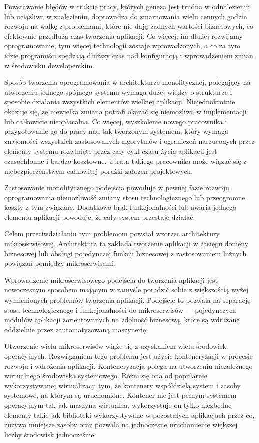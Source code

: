 \documentclass[12pt,twoside]{article}
\begin{document}
Powstawanie błędów w trakcie pracy, których geneza jest trudna w odnalezieniu lub uciążliwa w znalezieniu, doprowadza do zmarnowania wielu cennych godzin rozwoju na walkę z problemami, które nie dają żadnych wartości biznesowych, co efektownie przedłuża czas tworzenia aplikacji. Co więcej, im dłużej rozwijamy oprogramowanie, tym więcej technologii zostaje wprowadzonych, a co za tym idzie programiści spędzają dłuższy czas nad konfiguracją i wprowadzeniem zmian w środowisku deweloperskim.

Sposób tworzenia oprogramowania w architekturze monolitycznej, polegający na utworzeniu jednego spójnego systemu wymaga dużej wiedzy o strukturze i sposobie działania wszystkich elementów wielkiej aplikacji. Niejednokrotnie okazuje się, że niewielka zmiana potrafi okazać się niemożliwa w implementacji lub całkowicie nieopłacalna. Co więcej, wyszkolenie nowego pracownika i przygotowanie go do pracy nad tak tworzonym systemem, który wymaga znajomości wszystkich zastosowanych algorytmów i ograniczeń narzuconych przez elementy systemu rozwinięte przez cały cykl czasu życia aplikacji jest czasochłonne i bardzo kosztowne. Utrata takiego pracownika może wiązać się z niebezpieczeństwem całkowitej porażki założeń projektowych.

Zastosowanie monolitycznego podejścia powoduje w pewnej fazie rozwoju oprogramowania niemożliwość zmiany stosu technologicznego lub przeogromne koszty z tym związane. Dodatkowo brak funkcjonalności lub awaria jednego elementu aplikacji powoduje, że cały system przestaje działać.

Celem przeciwdziałaniu tym problemom powstał wzorzec architektury mikroserwisowej. Architektura ta zakłada tworzenie aplikacji w zasięgu domeny biznesowej lub obsługi pojedynczej funkcji biznesowej z zastosowaniem luźnych powiązań pomiędzy mikroserwisami.

Wprowadzenie mikroserwisowego podejścia do tworzenia aplikacji jest nowoczesnym sposobem mającym w zamyśle poradzić sobie z większością wyżej wymienionych problemów tworzenia aplikacji. Podejście to pozwala na separację stosu technologicznego i funkcjonalności do mikroserwisów — pojedynczych modułów aplikacji zorientowanych na zdolność biznesową, które są wdrażane oddzielnie przez zautomatyzowaną maszynerię\cite{fowler,fowler2}.

Utworzenie wielu mikroserwisów wiąże się z uzyskaniem wielu środowisk operacyjnych. Rozwiązaniem tego problemu jest użycie konteneryzacji w procesie rozwoju i wdrożenia aplikacji. Konteneryzacja polega na utworzeniu niezależnego wirtualnego środowiska systemowego\cite{virtualisation}. Różni się ona od popularnie wykorzystywanej wirtualizacji tym, że kontenery współdzielą system i zasoby systemowe, na którym są uruchomione. Kontener nie jest pełnym systemem operacyjnym tak jak maszyna wirtualna, wykorzystuje on tylko niezbędne elementy takie jak biblioteki wykorzystywane w pozostałych aplikacjach przez co, zużywa mniejsze zasoby oraz pozwala na jednoczesne uruchomienie większej liczby środowisk jednocześnie\cite{differences}.
\end{document}
